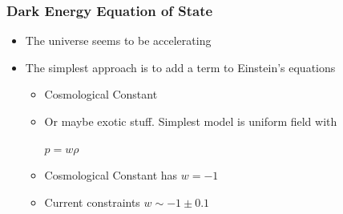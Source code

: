 \documentclass{beamer}
\begin{document}
\frame
{
    \frametitle{Dark Energy Equation of State}

 
    \begin{itemize}

        \item The universe seems to be accelerating

        \item The simplest approach is to add a term to Einstein's equations
        \begin{itemize}
            \item Cosmological Constant

            \item Or maybe exotic stuff.  Simplest model is uniform field with

                \vspace{5 mm}
                \begin{center}
                    {\color{gold}
                        {\huge $p = w \rho$}
                    }
                \end{center}
                \vspace{5 mm}

            \item Cosmological Constant has $w=-1$

            \item Current constraints $w \sim -1 \pm 0.1$

        \end{itemize}
    \end{itemize}

}
\end{document}
